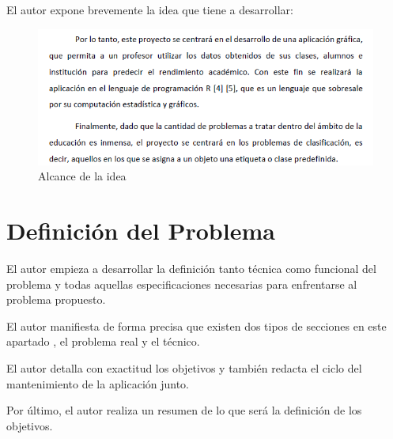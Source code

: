 \clearpage

El autor expone brevemente la idea que tiene a desarrollar:

\begin{figure}[H]
  \includegraphics[scale=0.7]{capitulos/img/img2.PNG}
  \caption{Alcance de la idea}
  \label{fig:img2}
\end{figure}


\section{Definición del Problema}

El autor empieza a desarrollar la definición tanto técnica como funcional del problema y todas aquellas especificaciones necesarias para enfrentarse al problema propuesto.

El autor manifiesta de forma precisa que existen dos tipos de secciones en este apartado , el problema real y el técnico.

El autor detalla con exactitud los objetivos
y también redacta el ciclo del mantenimiento de la aplicación junto.

Por último, el autor realiza un resumen de lo que será la definición de los objetivos.

\hspace{15px}



